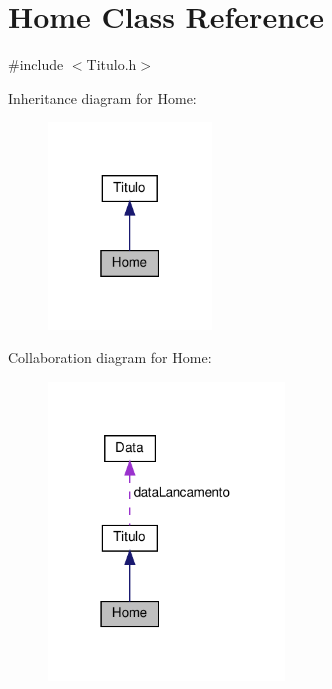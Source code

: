 \hypertarget{classHome}{}\section{Home Class Reference}
\label{classHome}


{\ttfamily \#include $<$Titulo.\+h$>$}



Inheritance diagram for Home\+:
\nopagebreak
\begin{figure}[H]
\begin{center}
\leavevmode
\includegraphics[width=123pt]{classHome__inherit__graph}
\end{center}
\end{figure}


Collaboration diagram for Home\+:
\nopagebreak
\begin{figure}[H]
\begin{center}
\leavevmode
\includegraphics[width=178pt]{classHome__coll__graph}
\end{center}
\end{figure}
